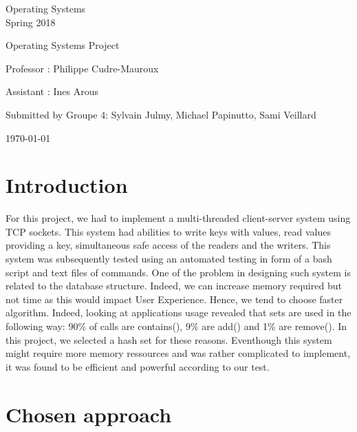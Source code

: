 \documentclass[a4paper,11pt]{report}
\begin{document}
    \begin{center}
        \Large{
            Operating Systems\\
            Spring 2018
        }

        \noindent\makebox[\linewidth]{\rule{\linewidth}{0.4pt}}
        Operating Systems Project
        \noindent\makebox[\linewidth]{\rule{\linewidth}{0.4pt}}

        \begin{flushleft}
            Professor : Philippe Cudre-Mauroux

            Assistant : Ines Arous
        \end{flushleft}

        \noindent\makebox[\linewidth]{\rule{\linewidth}{0.4pt}}

        Submitted by Groupe 4: Sylvain Julmy, Michael Papinutto, Sami Veillard

        \noindent\makebox[\linewidth]{\rule{\textwidth}{1pt}}
        \vspace*{0.8cm}
        \today

    \end{center}

    \newpage

    \section*{Introduction}
    For this project, we had to implement a multi-threaded client-server system using TCP sockets.
    This system had abilities to write keys with values, read values providing a key, simultaneous safe access of the readers and the writers.
    This system was subsequently tested using an automated testing in form of a bash script and text files of commands.
    One of the problem in designing such system is related to the database structure.
    Indeed, we can increase memory required but not time as this would impact User Experience.
    Hence, we tend to choose faster algorithm.
    Indeed, looking at applications usage revealed that sets are used in the following way: 90\% of calls are contains(),
    9\% are add() and 1\% are remove().
    In this project, we selected a hash set for these reasons.
    Eventhough this system might require more memory ressources and was rather complicated to implement, it was found to be efficient and powerful according to our test.


    \section*{Chosen approach}
\end{document}
